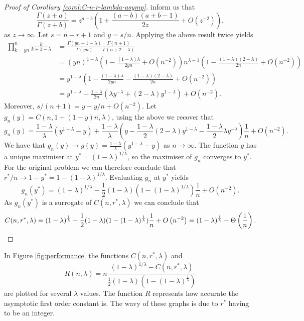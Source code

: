 \documentclass[11pt]{article}
\begin{document}
\begin{proof}[Proof of Corollary \ref{corol:C-n-r-lambda-asymp}]
    \citet[Equation 6.1.47]{abramowitz1948handbook} inform us that 
    $$
    \frac{\Gamma(z+a)}{\Gamma(z+b)}=z^{a-b}\left(1+\frac{(a-b)(a+b-1)}{2z}+O\left(z^{-2}\right)\right),
    $$
    as $z\to\infty$. Let $s=n-r+1$ and $y=s/n$. Applying the above result twice yields
    \begin{align*}
        \prod_{k=yn}^n\frac{k}{k+1-\lambda}&=\frac{\Gamma(yn+1-\lambda)}{\Gamma(yn)}\frac{\Gamma(n+1)}{\Gamma(n+2-\lambda)}\\&=(yn)^{1-\lambda}\left(1-\frac{(1-\lambda)\lambda}{2yn}+O\left(n^{-2}\right)\right)n^{\lambda-1}\left(1-\frac{(1-\lambda)(2-\lambda)}{2n}+O\left(n^{-2}\right)\right)\\
        &=y^{1-\lambda}\left(1-\frac{(1-\lambda)\lambda}{2yn}-\frac{(1-\lambda)(2-\lambda)}{2n}+O\left(n^{-2}\right)\right)\\
        &=y^{1-\lambda}-\frac{1-\lambda}{2n}\left(\lambda y^{-\lambda}+(2-\lambda)y^{1-\lambda}\right)+O\left(n^{-2}\right).
    \end{align*}
    Moreover, $s/(n+1)=y-y/n+O(n^{-2})$. Let $g_n(y)=C(n,1+(1-y)n,\lambda)$, using the above we recover that
    $$
    g_n(y)=\frac{1-\lambda}{\lambda}(y^{1-\lambda}-y)+\frac{1-\lambda}{\lambda}\left(y-\frac{1-\lambda}{2}(2-\lambda)y^{1-\lambda}-\frac{1-\lambda}{2}\lambda y^{-\lambda}\right)\frac{1}{n}+O\left(n^{-2}\right).
    $$
    We have that $g_n(y)\to g(y)=\frac{1-\lambda}{\lambda}(y^{1-\lambda}-y)$ as $n\to\infty$. The function $g$ has a unique maximiser at $y^*=(1-\lambda)^{1/\lambda}$, so the maximiser of $g_n$ converges to $y^*$. For the original problem we can therefore conclude that $r^*/n\to 1-y^*=1-(1-\lambda)^{1/\lambda}$. Evaluating $g_n$ at $y^*$ yields 
    $$
    g_n(y^*)=(1-\lambda)^{1/\lambda}-\frac{1}{2}(1-\lambda)(1-(1-\lambda)^{1/\lambda})\frac{1}{n}+O\left(n^{-2}\right).
    $$
    As $g_n(y^*)$ is a surrogate of $C(n,r^*,\lambda)$ we can conclude that
    \begin{equation*}
        C(n,r^*,\lambda)=(1-\lambda)^{\frac{1}{\lambda}}-\frac{1}{2}(1-\lambda)(1-(1-\lambda)^{\frac{1}{\lambda}})\frac{1}{n}+O\left(n^{-2}\right)=(1-\lambda)^{\frac{1}{\lambda}}-\Theta\left(\frac{1}{n}\right).\qedhere
    \end{equation*}
\end{proof}
In Figure \ref{fig:performance} the functions $C(n,r^*,\lambda)$ and 
$$
R(n,\lambda)=n\frac{(1-\lambda)^{1/\lambda}-C(n,r^*,\lambda)}{\frac{1}{2}(1-\lambda)(1-(1-\lambda)^{\frac{1}{\lambda}})}
$$
are plotted for several $\lambda$ values. The function $R$ represents how accurate the asymptotic first order constant is. The wavy of these graphs is due to $r^*$ having to be an integer.
\end{document}
